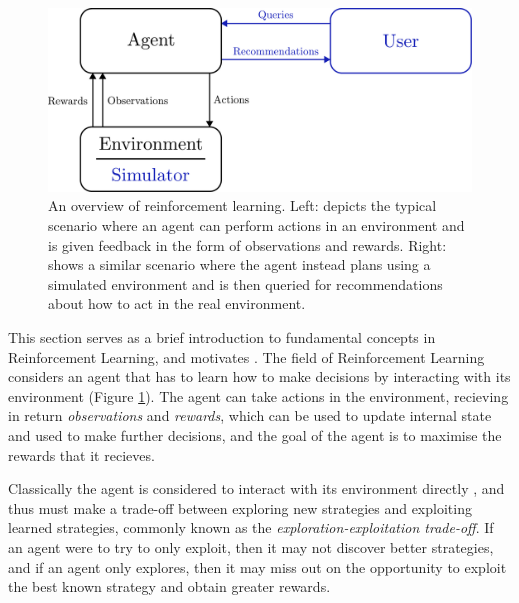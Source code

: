     \begin{figure}
        \centering\includegraphics[width=1.0\textwidth]{figures/ch2/rl_overview.pdf} 
        \caption[An overview of reinforcement learning.]{An overview of reinforcement learning. Left: depicts the typical scenario where an agent can perform actions in an environment and is given feedback in the form of observations and rewards. Right: shows a similar scenario where the agent instead plans using a simulated environment and is then queried for recommendations about how to act in the real environment. }
        \label{fig:rl_overview}
    \end{figure}



    This section serves as a brief introduction to fundamental concepts in Reinforcement Learning, and motivates . The field of Reinforcement Learning considers an agent that has to learn how to make decisions by interacting with its environment (Figure \ref{fig:rl_overview}). The agent can take actions in the environment, recieving in return \textit{observations} and \textit{rewards}, which can be used to update internal state and used to make further decisions, and the goal of the agent is to maximise the rewards that it recieves.

    Classically the agent is considered to interact with its environment directly , and thus must make a trade-off between exploring new strategies and exploiting learned strategies, commonly known as the \textit{exploration-exploitation trade-off}. If an agent were to try to only exploit, then it may not discover better strategies, and if an agent only explores, then it may miss out on the opportunity to exploit the best known strategy and obtain greater rewards.

